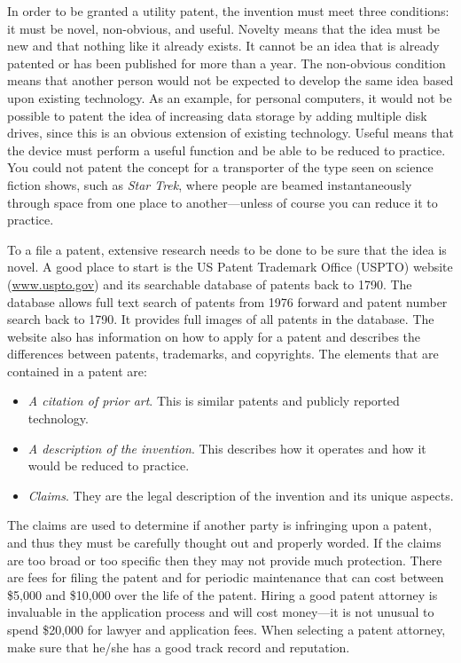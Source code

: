 In order to be granted a utility patent, the invention must meet three
conditions: it must be novel, non-obvious, and useful. Novelty means
that the idea must be new and that nothing like it already exists. It
cannot be an idea that is already patented or has been published for
more than a year. The non-obvious condition means that another person
would not be expected to develop the same idea based upon existing
technology. As an example, for personal computers, it would not be
possible to patent the idea of increasing data storage by adding
multiple disk drives, since this is an obvious extension of existing
technology. Useful means that the device must perform a useful function
and be able to be reduced to practice. You could not patent the concept
for a transporter of the type seen on science fiction shows, such as
\emph{Star Trek}, where people are beamed instantaneously through space
from one place to another---unless of course you can reduce it to
practice.

To a file a patent, extensive research needs to be done to be sure that
the idea is novel. A good place to start is the US Patent Trademark
Office (USPTO) website (\href{http://www.uspto.gov}{www.uspto.gov}) and
its searchable database of patents back to 1790. The database allows
full text search of patents from 1976 forward and patent number search
back to 1790. It provides full images of all patents in the database.
The website also has information on how to apply for a patent and
describes the differences between patents, trademarks, and copyrights.
The elements that are contained in a patent are:

\begin{itemize}
\item
  \emph{A citation of prior art}. This is similar patents and publicly
  reported technology.
\item
  \emph{A description of the invention}. This describes how it operates
  and how it would be reduced to practice.
\item
  \emph{Claims}. They are the legal description of the invention and its
  unique aspects.
\end{itemize}

The claims are used to determine if another party is infringing upon a
patent, and thus they must be carefully thought out and properly worded.
If the claims are too broad or too specific then they may not provide
much protection. There are fees for filing the patent and for periodic
maintenance that can cost between \$5,000 and \$10,000 over the life of
the patent. Hiring a good patent attorney is invaluable in the
application process and will cost money---it is not unusual to spend
\$20,000 for lawyer and application fees. When selecting a patent
attorney, make sure that he/she has a good track record and reputation.

